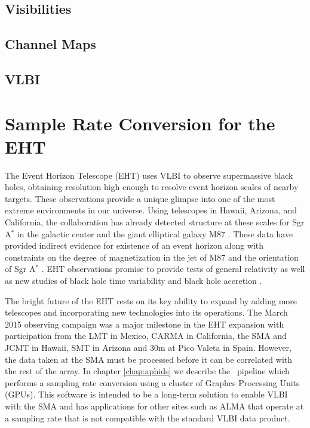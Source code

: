 \subsection{Visibilities}
\subsection{Channel Maps}
\subsection{VLBI}

\section{Sample Rate Conversion for the EHT}

The Event Horizon Telescope (EHT) uses VLBI to observe supermassive black holes, obtaining resolution high enough
to resolve event horizon scales of nearby targets.  These observations provide a 
unique glimpse into one of the most extreme environments in our universe.  Using telescopes in Hawaii, Arizona, 
and California, the collaboration has already detected structure at these scales for Sgr A$^\ast$ in the galactic 
center and the giant elliptical galaxy M87 \citep{doeleman08,doeleman09}.  These data have provided indirect 
evidence for existence of an event horizon \citep{broderick15} along with constraints on the degree of 
magnetization in the jet of M87 \citep{kino15} and the orientation of Sgr A$^\ast$ \citep{broderick11}.  EHT 
observations promise to provide tests of general relativity \citep{luminet79,johannsen10,bambi13,broderick14} as 
well as new studies of black hole time variability \citep{doeleman09} and black hole accretion \citep{chan15}.

The bright future of the EHT rests on its key ability to expand by adding more telescopes and
incorporating new technologies into its operations.  The March 2015 observing campaign was a major milestone in
the EHT expansion with participation from the LMT in Mexico, CARMA in California, the SMA and JCMT in Hawaii, 
SMT in Arizona and 30m at Pico Valeta in Spain.  However, the data taken at the SMA must be processed before it
can be correlated with the rest of the array.  In chapter \ref{chap:aphids} we describe the \APHIDS\, pipeline
which performs a sampling rate conversion using a cluster of Graphcs Processing Units (GPUs).  This software
is intended to be a long-term solution to enable VLBI with the SMA and has applications for other sites such 
as ALMA that operate at a sampling rate that is not compatible with the standard VLBI data product.

